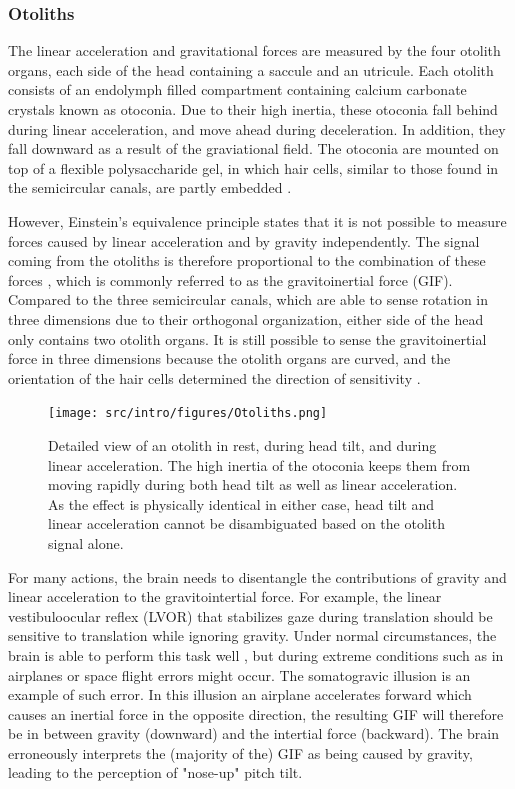 \subsubsection{Otoliths}
The linear acceleration and gravitational forces are measured by the four otolith organs, each side of the head containing a saccule and an utricule. Each otolith consists of an endolymph filled compartment containing calcium carbonate crystals known as otoconia. Due to their high inertia, these otoconia fall behind during linear acceleration, and move ahead during deceleration. In addition, they fall downward as a result of the graviational field. The otoconia are mounted on top of a flexible polysaccharide gel, in which hair cells, similar to those found in the semicircular canals, are partly embedded \cite{goldberg2012}.  

However, Einstein's equivalence principle states that  it is not possible to measure forces caused by linear acceleration and by gravity independently. The signal coming from the otoliths is therefore proportional to the combination of these forces \cite{fernandez1976b}, which is commonly referred to as the gravitoinertial force (GIF). Compared to the three semicircular canals, which are able to sense rotation in three dimensions due to their orthogonal organization, either side of the head only contains two otolith organs. It is still possible to sense the gravitoinertial force in three dimensions because the otolith organs are curved, and the orientation of the hair cells determined the direction of sensitivity \cite{goldberg2012}.

\begin{figure}
    \texttt{[image: src/intro/figures/Otoliths.png]}
    \caption{Detailed view of an otolith  in rest,  during head tilt, and  during linear acceleration. The high inertia of the otoconia keeps them from moving rapidly during both head tilt as well as linear acceleration. As the effect is physically identical in either case, head tilt and linear acceleration cannot be disambiguated based on the otolith signal alone.}
    \label{intro:fig7}
\end{figure}

For many actions, the brain needs to disentangle the contributions of gravity and linear acceleration to the gravitointertial force. For example, the linear vestibuloocular reflex (LVOR) that stabilizes gaze during translation should be sensitive to translation while ignoring gravity. Under normal circumstances, the brain is able to perform this task well \cite{merfeld1995}, but during extreme conditions such as in airplanes or space flight errors might occur. The somatogravic illusion \cite{glasauer1995} is an example of such error. In this illusion an airplane accelerates forward which causes an inertial force in the opposite direction, the resulting GIF will therefore be in between gravity (downward) and the intertial force (backward). The brain erroneously interprets the (majority of the) GIF as being caused by gravity, leading to the perception of "nose-up" pitch tilt.

